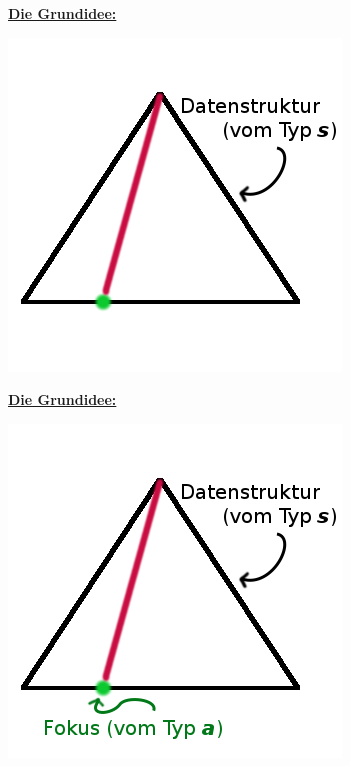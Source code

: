 \documentclass{beamer}
\begin{document}

\begin{frame}

\Large \textbf{\underline{Die Grundidee:}}\normalsize

\begin{center}
\includegraphics[scale=0.5]{lens_1.png} 
\end{center}

\end{frame}


\begin{frame}

\Large \textbf{\underline{Die Grundidee:}}\normalsize

\begin{center}
\includegraphics[scale=0.5]{lens_2.png} 
\end{center}

\end{frame}
\end{document}
